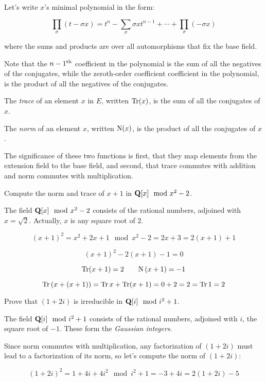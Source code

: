 Let's write $x$'s minimal polynomial in the form:


$$\prod_\sigma \left( t - \sigma x \right) = t^n - \sum_\sigma \sigma x t^{n-1} + \cdots + \prod_\sigma (-\sigma x) $$

where the sums and products are over all automorphisms that fix the base field.

Note that the $n-1^{\rm th}$ coefficient in the polynomial is the sum
of all the negatives of the conjugates, while the zeroth-order
coefficient coefficient in the polynomial, is the product of all the
negatives of the conjugates.

The {\it trace} of an element $x$ in $E$, written ${\rm Tr}(x)$, is
the sum of all the conjugates of $x$.
\enddefinition

The {\it norm} of an element $x$, written ${\rm N}(x)$, is the product
of all the conjugates of $x$.
\enddefinition

The significance of these two functions is first, that they map
elements from the extension field to the base field, and second, that
trace commutes with addition and norm commutes with multiplication.

\example Compute the norm and trace of $x+1$ in ${\bf Q}[x] \mod x^2-2$.

The field ${\bf Q}[x] \mod x^2-2$ consists of the rational numbers,
adjoined with $x=\sqrt{2}$.  Actually, $x$ is any square root of $2$.

$$(x+1)^2 = x^2+2x+1 \mod x^2-2 = 2x+3 = 2(x+1) + 1$$

$$(x+1)^2 - 2(x+1) - 1 = 0$$

$$\Tr (x+1) = 2 \qquad {\rm N\,} (x+1) = -1$$

$$\Tr \left(x + (x+1)\right) = \Tr x + \Tr (x+1) = 0 + 2 = 2 = \Tr 1 = 2$$

\endexample

\example Prove that $(1+2i)$ is irreducible in ${\bf Q}[i] \mod i^2+1$.

The field ${\bf Q}[i] \mod i^2+1$ consists of the rational numbers,
adjoined with $i$, the square root of $-1$.  These form the {\it
Gaussian integers}.

Since norm commutes with multiplication, any factorization of $(1+2i)$
must lead to a factorization of its norm, so let's compute the norm
of $(1+2i)$:

$$(1+2i)^2 = 1 +4i +4i^2 \mod i^2+1 = -3+4i = 2(1+2i) - 5$$


